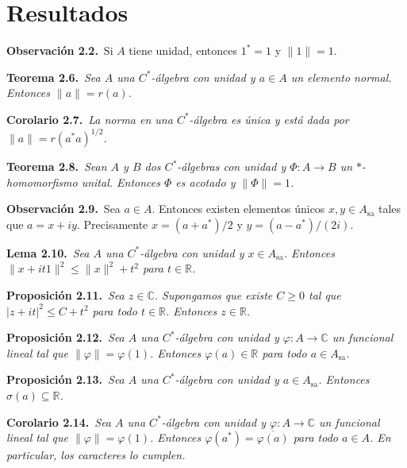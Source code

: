 \documentclass[11pt]{article}
\newcommand{\Asa}{A_{\mathrm{sa}}}
\newenvironment{teorema}[1]{\par\medskip\noindent\textbf{Teorema #1.}\ \itshape}{\par\medskip}
\newenvironment{proposicion}[1]{\par\medskip\noindent\textbf{Proposición #1.}\ \itshape}{\par\medskip}
\newenvironment{corolario}[1]{\par\medskip\noindent\textbf{Corolario #1.}\ \itshape}{\par\medskip}
\newenvironment{lema}[1]{\par\medskip\noindent\textbf{Lema #1.}\ \itshape}{\par\medskip}
\newenvironment{observacion}[1]{\par\medskip\noindent\textbf{Observación #1.}\ }{\par\medskip}
\begin{document}
\section*{Resultados}
\begin{observacion}{2.2}Si $A$ tiene unidad, entonces $1^*=1$ y $\lVert1\rVert=1$.\end{observacion}
\begin{teorema}{2.6}Sea $A$ una $C^*$-álgebra con unidad y $a\in A$ un elemento normal. Entonces $\lVert a\rVert=r(a)$.\end{teorema}
\begin{corolario}{2.7}La norma en una $C^*$-álgebra es única y está dada por $\lVert a\rVert=r(a^*a)^{1/2}$.\end{corolario}
\begin{teorema}{2.8}Sean $A$ y $B$ dos $C^*$-álgebras con unidad y $\Phi:A\to B$ un $*$-homomorfismo unital. Entonces $\Phi$ es acotado y $\lVert\Phi\rVert=1$.\end{teorema}
\begin{observacion}{2.9}Sea $a\in A$. Entonces existen elementos únicos $x,y\in\Asa$ tales que $a=x+iy$. Precisamente $x=(a+a^*)/2$ y $y=(a-a^*)/(2i)$.\end{observacion}
\begin{lema}{2.10}Sea $A$ una $C^*$-álgebra con unidad y $x\in\Asa$. Entonces $\lVert x+it1\rVert^2\le \lVert x\rVert^2+t^2$ para $t\in\mathbb R$.\end{lema}
\begin{proposicion}{2.11}Sea $z\in\mathbb C$. Supongamos que existe $C\ge0$ tal que $|z+it|^2\le C+t^2$ para todo $t\in\mathbb R$. Entonces $z\in\mathbb R$.\end{proposicion}
\begin{proposicion}{2.12}Sea $A$ una $C^*$-álgebra con unidad y $\varphi:A\to\mathbb C$ un funcional lineal tal que $\lVert\varphi\rVert=\varphi(1)$. Entonces $\varphi(a)\in\mathbb R$ para todo $a\in\Asa$.\end{proposicion}
\begin{proposicion}{2.13}Sea $A$ una $C^*$-álgebra con unidad y $a\in\Asa$. Entonces $\sigma(a)\subseteq\mathbb R$.\end{proposicion}
\begin{corolario}{2.14}Sea $A$ una $C^*$-álgebra con unidad y $\varphi:A\to\mathbb C$ un funcional lineal tal que $\lVert\varphi\rVert=\varphi(1)$. Entonces $\varphi(a^*)=\overline{\varphi(a)}$ para todo $a\in A$. En particular, los caracteres lo cumplen.\end{corolario}
\end{document}
